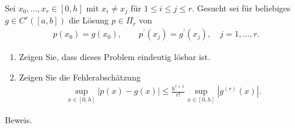 \begin{exercise}
Sei $x_0,\dots,x_r \in [0,h]$ mit $x_i \neq x_j$ für $1 \leq i \leq j \leq r$.
Gesucht sei für beliebiges $g \in C^r([a,b])$ die Lösung $p \in \Pi_r$ von
\begin{align}
  p(x_0) = g(x_0), \qquad p^{\prime}(x_j) = g^{\prime}(x_j), \quad j = 1,\dots,r.
\end{align}
\begin{enumerate}[label = \textbf{\alph*)}]
  \item Zeigen Sie, dass dieses Problem eindeutig lösbar ist.
  \item Zeigen Sie die Fehlerabschätzung
  \begin{align}
    \sup_{x \in [0,h]} |p(x) - g(x)| \leq \frac{h^{r+1}}{r!}
    \sup_{x \in [0,h]}\left|g^{(r)}(x)\right|.
  \end{align}
\end{enumerate}
\end{exercise}
\begin{solution}
Beweis.
\end{solution}
